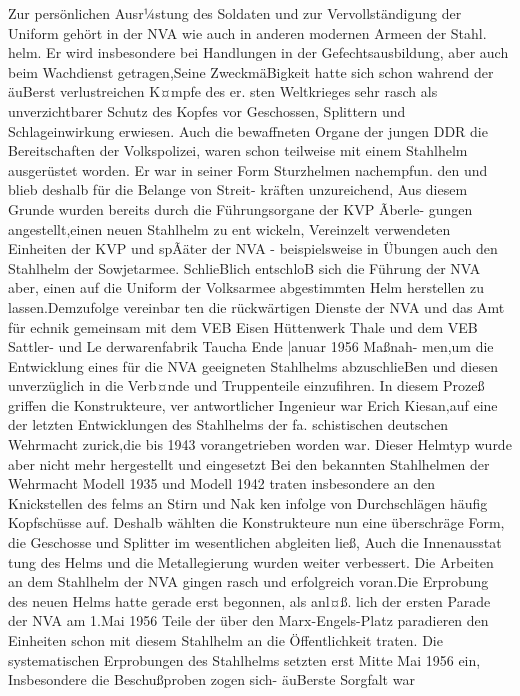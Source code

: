 

Zur persönlichen Ausr¼stung des Soldaten und zur
Vervollständigung der Uniform gehört in der NVA
wie auch in anderen modernen Armeen der Stahl.
helm. Er wird insbesondere bei Handlungen in der
Gefechtsausbildung, aber auch beim Wachdienst getragen,Seine ZweckmäBigkeit hatte sich schon
wahrend der äuBerst verlustreichen K¤mpfe des er.
sten Weltkrieges sehr rasch als unverzichtbarer
Schutz des Kopfes vor Geschossen, Splittern und
Schlageinwirkung erwiesen.
Auch die bewaffneten Organe der jungen DDR
die Bereitschaften der Volkspolizei, waren schon
teilweise mit einem Stahlhelm ausgerüstet worden.
Er war in seiner Form Sturzhelmen nachempfun.
den und blieb deshalb für die Belange von Streit-
kräften unzureichend, Aus diesem Grunde wurden
bereits durch die Führungsorgane der KVP Ãberle-
gungen angestellt,einen neuen Stahlhelm zu ent
wickeln, Vereinzelt verwendeten Einheiten der KVP
und spÃäter der NVA - beispielsweise in Übungen
auch den Stahlhelm der Sowjetarmee. SchlieBlich
entschloB sich die Führung der NVA aber, einen
auf die Uniform der Volksarmee abgestimmten
Helm herstellen zu lassen.Demzufolge vereinbar
ten die rückwärtigen Dienste der NVA und das
Amt für echnik gemeinsam mit dem VEB Eisen
Hüttenwerk Thale und dem VEB Sattler- und Le
derwarenfabrik Taucha Ende |anuar 1956 Maßnah-
men,um die Entwicklung eines für die NVA
geeigneten Stahlhelms abzuschlieBen und diesen
unverzüglich in die Verb¤nde und Truppenteile
einzufihren.
In diesem Prozeß griffen die Konstrukteure, ver
antwortlicher Ingenieur war Erich Kiesan,auf eine
der letzten Entwicklungen des Stahlhelms der fa.
schistischen deutschen Wehrmacht zurick,die bis
1943 vorangetrieben worden war. Dieser Helmtyp
wurde aber nicht mehr hergestellt und eingesetzt
Bei den bekannten Stahlhelmen der Wehrmacht
Modell 1935 und Modell 1942 traten insbesondere
an den Knickstellen des felms an Stirn und Nak
ken infolge von Durchschlägen häufig Kopfschüsse
auf. Deshalb wählten die Konstrukteure nun eine
überschräge Form, die Geschosse und Splitter im
wesentlichen abgleiten ließ, Auch die Innenausstat
tung des Helms und die Metallegierung wurden
weiter verbessert.
Die Arbeiten an dem Stahlhelm der NVA gingen rasch und erfolgreich voran.Die Erprobung des
neuen Helms hatte gerade erst begonnen, als anl¤ß.
lich der ersten Parade der NVA am 1.Mai 1956
Teile der über den Marx-Engels-Platz paradieren
den Einheiten schon mit diesem Stahlhelm an die
Öffentlichkeit traten.
Die systematischen Erprobungen des Stahlhelms
setzten erst Mitte Mai 1956 ein, Insbesondere die
Beschußproben zogen sich- äuBerste Sorgfalt war
